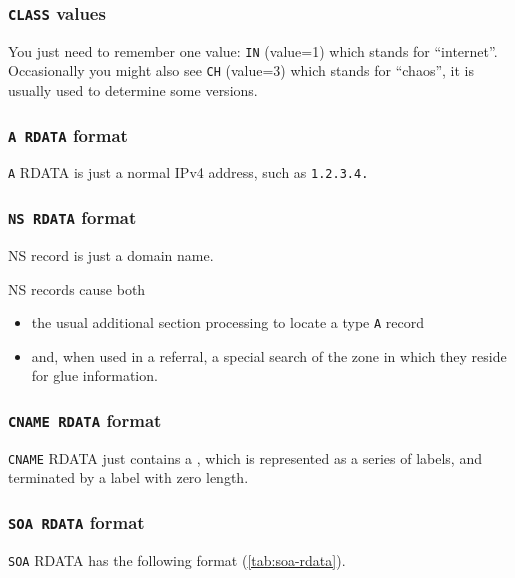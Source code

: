 \subsubsection{\texttt{CLASS} values}

You just need to remember one value: \texttt{IN} (value=1) which stands for
``internet''. Occasionally you might also see \texttt{CH} (value=3) which stands
for ``chaos'', it is usually used to determine some versions.


\subsubsection{\texttt{A RDATA} format}
\texttt{A} RDATA is just a normal IPv4 address, such as \texttt{1.2.3.4.}

\subsubsection{\texttt{NS RDATA} format}
NS record is just a domain name.

NS records cause both
\begin{itemize}
\item the usual additional section processing to locate a type \texttt{A} record
\item and, when used in a referral, a special search of the zone in which they
  reside for glue information.
\end{itemize}


\subsubsection{\texttt{CNAME RDATA} format}

\texttt{CNAME} RDATA just contains a , which is represented as
a series of labels, and terminated by a label with zero length.

\subsubsection{\texttt{SOA RDATA} format}

\texttt{SOA} RDATA has the following format (\cref{tab:soa-rdata}).

